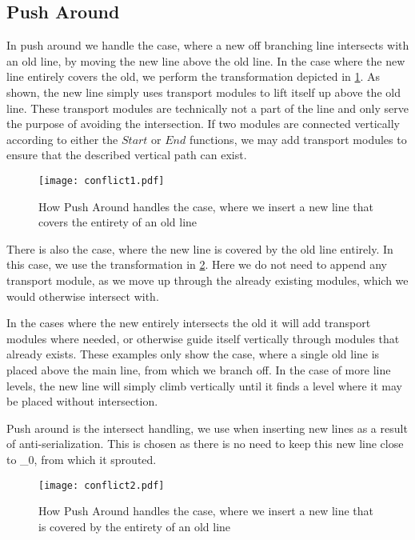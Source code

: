 \subsection{Push Around} \label{ssec:paround}
In push around we handle the case, where a new off branching line intersects with an old line, by moving the new line above the old line. In the case where the new line entirely covers the old, we perform the transformation depicted in \cref{fig:pusharound1}. As shown, the new line simply uses transport modules to lift itself up above the old line. These transport modules are technically not a part of the line and only serve the purpose of avoiding the intersection. If two modules are connected vertically according to either the $Start$ or $End$ functions, we may add transport modules to ensure that the described vertical path can exist.

\begin{figure}[h]
\centering
\texttt{[image: conflict1.pdf]}
\caption{How Push Around handles the case, where we insert a new line that covers the entirety of an old line}
\label{fig:pusharound1}
\end{figure}

There is also the case, where the new line is covered by the old line entirely. In this case, we use the transformation in \cref{fig:pusharound2}. Here we do not need to append any transport module, as we move up through the already existing modules, which we would otherwise intersect with. 

In the cases where the new entirely intersects the old it will add transport modules where needed, or otherwise guide itself vertically through modules that already exists. These examples only show the case, where a single old line is placed above the main line, from which we branch off. In the case of more line levels, the new line will simply climb vertically until it finds a level where it may be placed without intersection. 

Push around is the intersect handling, we use when inserting new lines as a result of anti-serialization. This is chosen as there is no need to keep this new line close to \Gamma_0, from which it sprouted. 

\begin{figure}[H]
\centering
\texttt{[image: conflict2.pdf]}
\caption{How Push Around handles the case, where we insert a new line that is covered by the entirety of an old line}
\label{fig:pusharound2}
\end{figure}

